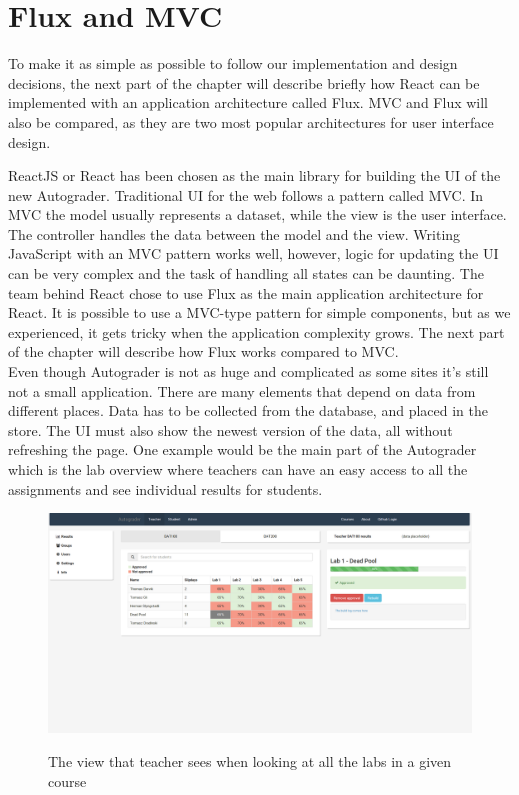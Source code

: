 \section{Flux and MVC}\label{sec:fluxmvc}
To make it as simple as possible to follow our implementation and design decisions, the next part of the chapter will describe briefly how React can be implemented with an application architecture called Flux. MVC and Flux will also be compared, as they are two most popular architectures for user interface design.

ReactJS or React has been chosen as the main library for building the UI of the new Autograder. Traditional UI for the web follows a pattern called MVC. In MVC the model usually represents a dataset, while the view is the user interface. The controller handles the data between the model and the view. Writing JavaScript with an MVC pattern works well, however, logic for updating the UI can be very complex and the task of handling all states can be daunting. The team behind React chose to use Flux as the main application architecture for React. It is possible to use a MVC-type pattern for simple components, but as we experienced, it gets tricky when the application complexity grows. The next part of the chapter will describe how Flux works compared to MVC.
\\Even though Autograder is not as huge and complicated as some sites it's still not a small application. There are many elements that depend on data from different places. Data has to be collected from the database, and placed in the store. The UI must also show the newest version of the data, all without refreshing the page. One example would be the main part of the Autograder which is the lab overview where teachers can have an easy access to all the assignments and see individual results for students.
\\
\begin{figure}[h]
  {\includegraphics[width=1\linewidth]{./graphs/laboverviewteacher}}
  \caption{The view that teacher sees when looking at all the labs in a given course}
  \label{fig:laboverviewteacher}
\end{figure}
